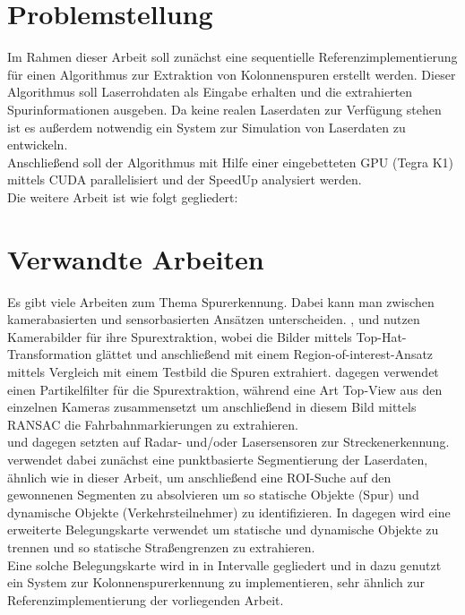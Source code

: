 \section{Problemstellung}\label{problemstellung}
Im Rahmen dieser Arbeit soll zunächst eine sequentielle Referenzimplementierung für einen Algorithmus zur Extraktion von Kolonnenspuren erstellt werden. Dieser Algorithmus soll Laserrohdaten als Eingabe erhalten und die extrahierten Spurinformationen ausgeben. Da keine realen Laserdaten zur Verfügung stehen ist es außerdem notwendig ein System zur Simulation von Laserdaten zu entwickeln.\\
Anschließend soll der Algorithmus mit Hilfe einer eingebetteten GPU (Tegra K1) mittels CUDA parallelisiert und der SpeedUp analysiert werden.\\
Die weitere Arbeit ist wie folgt gegliedert:

\section{Verwandte Arbeiten}\label{verwandteArbeiten}
Es gibt viele Arbeiten zum Thema Spurerkennung. Dabei kann man zwischen kamerabasierten und sensorbasierten Ansätzen unterscheiden.
\cite{SASH}, \cite{SKAD} und \cite{aly08} nutzen Kamerabilder für ihre Spurextraktion, wobei \cite{SASH} die Bilder mittels Top-Hat-Transformation glättet und anschließend mit einem Region-of-interest-Ansatz mittels Vergleich mit einem Testbild die Spuren extrahiert. \cite{SKAD} dagegen verwendet einen Partikelfilter für die Spurextraktion, während \cite{aly08} eine Art Top-View aus den einzelnen Kameras zusammensetzt um anschließend in diesem Bild mittels RANSAC die Fahrbahnmarkierungen zu extrahieren.\\
\cite{JDS01} und \cite{WSD07} dagegen setzten auf Radar- und/oder Lasersensoren zur Streckenerkennung. \cite{JDS01} verwendet dabei zunächst eine punktbasierte Segmentierung der Laserdaten, ähnlich wie in dieser Arbeit, um anschließend eine ROI-Suche auf den gewonnenen Segmenten zu absolvieren um so statische Objekte (Spur) und dynamische Objekte (Verkehrsteilnehmer) zu identifizieren. In \cite{WSD07} dagegen wird eine erweiterte Belegungskarte verwendet um statische und dynamische Objekte zu trennen und so statische Straßengrenzen zu extrahieren.\\
Eine solche Belegungskarte wird in \cite{WBU13} in Intervalle gegliedert und in \cite{WBU15} dazu genutzt ein System zur Kolonnenspurerkennung zu implementieren, sehr ähnlich zur Referenzimplementierung der vorliegenden Arbeit.